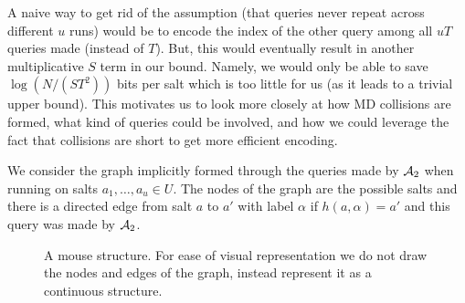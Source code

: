 A naive way to get rid of the assumption (that queries never repeat across different $u$ runs) would be to encode the index of the other query among all $uT$ queries made (instead of $T$). 
But, this would eventually result in another multiplicative $S$ term in our bound. Namely, we would only be able to save $\log (N/(ST^2))$ bits per salt which is too little for us (as it leads to a trivial upper bound). This motivates us to look more closely at how MD collisions are formed, what kind of queries could be involved, and how we could leverage the fact that collisions are short to get more efficient encoding.

 We consider the graph implicitly formed through the queries made by $\mathcal{A}_2$ when running on salts $a_1,\ldots,a_u \in U$.
The nodes of the graph are the possible salts and there is a directed edge from salt $a$ to $a'$ with label $\alpha$ if $h(a,\alpha)=a'$ and this query was made by $\mathcal{A}_2$.
\begin{figure}[t]
    \centering
    \caption{A mouse structure. For ease of visual representation we do not draw the nodes and edges of the graph, instead represent it as a continuous structure.} \label{fig:mouse-structure-to}
\end{figure}

